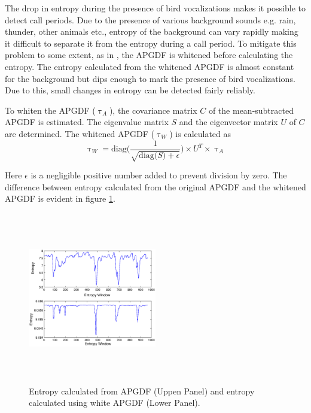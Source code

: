 \documentclass[a4paper]{article}
\begin{document}
The drop in entropy during the presence of bird vocalizations makes it possible
to detect call periods. Due to the presence of various background sounds e.g.
rain, thunder, other animals etc., entropy of the background can  vary rapidly
making it difficult to separate it from the entropy during a call period. To
mitigate this problem to some extent, as in \cite{wang2013}, the APGDF is
whitened before calculating the entropy. The entropy calculated from the
whitened APGDF is almost constant for the background but dips enough to mark the
presence of bird vocalizations. Due to this, small changes in entropy can be
detected fairly reliably. 

To whiten the APGDF ($\uptau_A$), the covariance matrix $C$ of the mean-subtracted
APGDF is estimated. The eigenvalue matrix $S$ and the eigenvector matrix
$U$ of $C$ are determined. The whitened APGDF
($\uptau_W$) is calculated as
\begin{equation}
\label{eq:4}
\uptau_W=\text{diag} \bigg(  \frac{1}{\sqrt{\text{diag($S$)}+\epsilon}} 
\bigg )\times \text{$U^T$} \times \uptau_A
\end{equation}

Here $\epsilon$ is a negligible positive number added to prevent division by zero. 
 The difference
between entropy calculated from the original APGDF and the whitened APGDF is
evident in figure \ref{fig:entropy}.

\begin{figure}[h]
\centering
\includegraphics[width=0.5\textwidth,height=7.5cm]{Entropy_gd_white_non_white.eps}
\caption{ Entropy calculated from APGDF (Uppen Panel) and entropy calculated using white APGDF (Lower Panel).}
\label{fig:entropy}
\end{figure}
\end{document}
